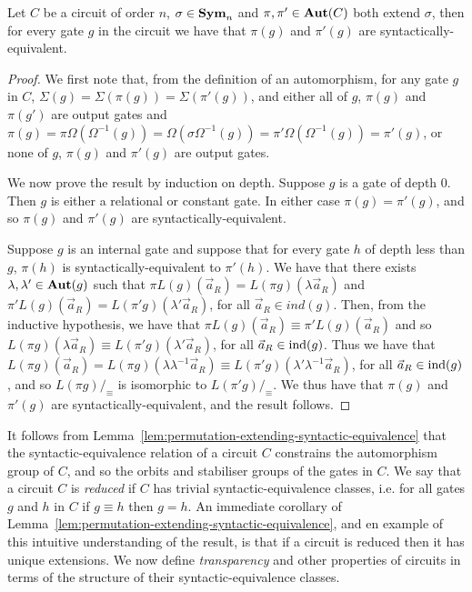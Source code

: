 \documentclass[../main/thesis.tex]{subfiles}
\begin{document}
\begin{lem}
  Let $C$ be a circuit of order $n$, $\sigma \in \text{\textbf{Sym}}_n$ and $\pi, \pi' \in
  \text{\textbf{Aut}}(C)$ both extend $\sigma$, then for every gate $g$ in the circuit we have
  that $\pi (g)$ and $\pi'(g)$ are syntactically-equivalent.
  \label{lem:permutation-extending-syntactic-equivalence}
\end{lem}
\begin{proof}
  We first note that, from the definition of an automorphism, for any gate $g$
  in $C$, $\Sigma (g) = \Sigma (\pi (g)) = \Sigma (\pi' (g))$, and either all of
  $g$, $\pi (g)$ and $\pi (g')$ are output gates and $\pi (g) = \pi \Omega
  (\Omega^{-1}(g)) = \Omega (\sigma \Omega^{-1}(g)) = \pi' \Omega
  (\Omega^{-1}(g)) = \pi'(g)$, or none of $g$, $\pi(g)$ and $\pi' (g)$ are
  output gates.
  
  We now prove the result by induction on depth. Suppose $g$ is a gate of depth
  $0$. Then $g$ is either a relational or constant gate. In either case $\pi (g)
  = \pi' (g)$, and so $\pi(g)$ and $\pi'(g)$ are syntactically-equivalent.

  Suppose $g$ is an internal gate and suppose that for every gate $h$ of depth
  less than $g$, $\pi (h)$ is syntactically-equivalent to $\pi'(h)$. We have
  that there exists $\lambda, \lambda' \in \text{\textbf{Aut}}(g)$ such that $\pi
  L(g)(\vec{a}_R) = L(\pi g) (\lambda \vec{a}_R)$ and $\pi' L(g)(\vec{a}_R) =
  L(\pi' g)(\lambda' \vec{a}_R)$, for all $\vec{a}_R \in ind(g)$. Then, from the
  inductive hypothesis, we have that $\pi L(g)(\vec{a}_R) \equiv \pi
  'L(g)(\vec{a}_R)$ and so $L(\pi g)(\lambda \vec{a}_R) \equiv L(\pi' g)
  (\lambda' \vec{a}_R)$, for all $\vec{a}_R \in \text{\upshape ind}(g)$. Thus we have that
  $L(\pi g) (\vec{a}_R) = L (\pi g) (\lambda \lambda^{-1}\vec{a}_R) \equiv
  L(\pi' g) (\lambda' \lambda^{-1}\vec{a}_R)$, for all $\vec{a}_R \in \text{\upshape ind}(g)$,
  and so $L(\pi g)/_\equiv$ is isomorphic to $L(\pi'g) /_\equiv$. We thus have
  that $\pi (g) $ and $\pi' (g)$ are syntactically-equivalent, and the result
  follows.
  
\end{proof}

It follows from Lemma~\ref{lem:permutation-extending-syntactic-equivalence} that
the syntactic-equivalence relation of a circuit $C$ constrains the automorphism
group of $C$, and so the orbits and stabiliser groups of the gates in $C$. We
say that a circuit $C$ is \emph{reduced} if $C$ has trivial
syntactic-equivalence classes, i.e. for all gates $g$ and $h$ in $C$ if $g
\equiv h$ then $g = h$. An immediate corollary of
Lemma~\ref{lem:permutation-extending-syntactic-equivalence}, and en example of
this intuitive understanding of the result, is that if a circuit is reduced then
it has unique extensions. We now define \emph{transparency} and other properties
of circuits in terms of the structure of their syntactic-equivalence classes.
\end{document}
